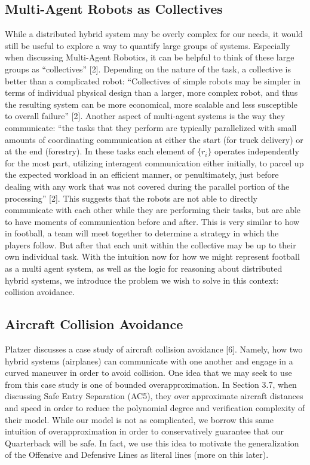 \subsection{Multi-Agent Robots as Collectives}
\quad While a distributed hybrid system may be overly complex for our needs, it would still be useful to explore a way to quantify large groups of systems. Especially when discussing Multi-Agent Robotics, it can be helpful to think of these large groups as “collectives” [2]. Depending on the nature of the task, a collective is better than a complicated robot: “Collectives of simple robots may be simpler in terms of individual physical design than a larger, more complex robot, and thus the resulting system can be more economical, more scalable and less susceptible to overall failure” [2]. Another aspect of multi-agent systems is the way they communicate: “the tasks that they perform are typically parallelized with small amounts of coordinating communication at either the start (for truck delivery) or at the end (forestry). In these tasks each element of $\{r_i\}$ operates independently for the most part, utilizing interagent communication either initially, to parcel up the expected workload in an efficient manner, or penultimately, just before dealing with any work that was not covered during the parallel portion of the processing” [2]. This suggests that the robots are not able to directly communicate with each other while they are performing their tasks, but are able to have moments of communication before and after. This is very similar to how in football, a team will meet together to determine a strategy in which the players follow. But after that each unit within the collective may be up to their own individual task. With the intuition now for how we might represent football as a multi agent system, as well as the logic for reasoning about distributed hybrid systems, we introduce the problem we wish to solve in this context: collision avoidance.

\subsection{Aircraft Collision Avoidance}
\quad Platzer discusses a case study of aircraft collision avoidance [6]. Namely, how two hybrid systems (airplanes) can communicate with one another and engage in a curved maneuver in order to avoid collision. One idea that we may seek to use from this case study is one of bounded overapproximation. In Section 3.7, when discussing Safe Entry Separation (AC5), they over approximate aircraft distances and speed in order to reduce the polynomial degree and verification complexity of their model. While our model is not as complicated, we borrow this same intuition of overapproximation in order to conservatively guarantee that our Quarterback will be safe. In fact, we use this idea to motivate the generalization of the Offensive and Defensive Lines as literal lines (more on this later). \\ 

